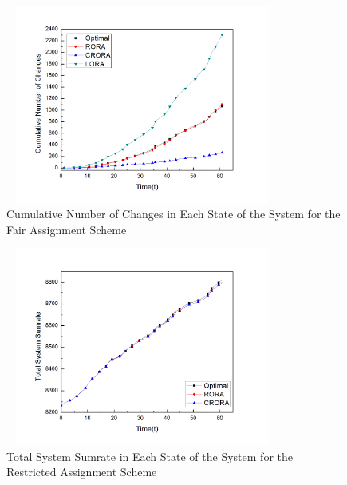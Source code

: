 \documentclass[times]{dacauth}
\begin{document}
\begin{figure}[t]
	{ %
		\setlength{\fboxsep}{1.5pt}%
		\setlength{\fboxrule}{1.5pt}%
		\centering
		\includegraphics[width=90mm,height=65mm]{Graph/nocFairjournal.jpg}
		\caption{Cumulative Number of Changes in Each State of the System for the Fair Assignment Scheme}
		\label{fig:noc_f}
		
	}
\end{figure}


\begin{figure}[t]
	{ %
		\setlength{\fboxsep}{1.5pt}%
		\setlength{\fboxrule}{1.5pt}%
		\centering
		\includegraphics[width=90mm,height=65mm]{Graph/sumrateresjournal.jpg}
		\caption{Total System Sumrate in Each State of the System for the Restricted Assignment Scheme}
		\label{fig:sum_r}
	}
\end{figure}
\end{document}
